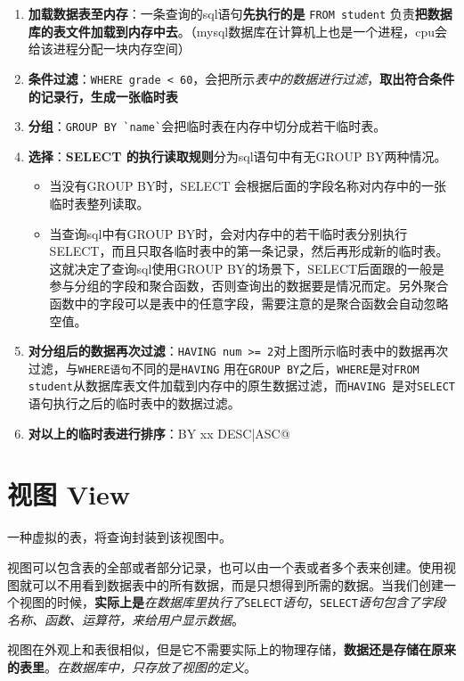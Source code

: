 \documentclass[UTF8,a4paper,12pt]{ctexbook}
\begin{document}
		\begin{enumerate}
			\item \textbf{加载数据表至内存}：一条查询的sql语句\textbf{先执行的是} \verb|FROM student| 负责\textbf{把数据库的表文件加载到内存中去}。（mysql数据库在计算机上也是一个进程，cpu会给该进程分配一块内存空间）
			\item \textbf{条件过滤}：\verb|WHERE grade < 60|，会把所示\textit{表中的数据进行过滤}，\textbf{取出符合条件的记录行，生成一张临时表}
			\item \textbf{分组}：\verb|GROUP BY `name`|会把临时表在内存中切分成若干临时表。
			\item \textbf{选择}：\textbf{SELECT 的执行读取规则}分为sql语句中有无GROUP BY两种情况。
				\begin{itemize}
					\item 当没有GROUP BY时，SELECT 会根据后面的字段名称对内存中的一张临时表整列读取。
					\item 当查询sql中有GROUP BY时，会对内存中的若干临时表分别执行SELECT，而且只取各临时表中的第一条记录，然后再形成新的临时表。这就决定了查询sql使用GROUP BY的场景下，SELECT后面跟的一般是参与分组的字段和聚合函数，否则查询出的数据要是情况而定。另外聚合函数中的字段可以是表中的任意字段，需要注意的是聚合函数会自动忽略空值。
				\end{itemize}
			\item \textbf{对分组后的数据再次过滤}：\verb|HAVING num >= 2|对上图所示临时表中的数据再次过滤，与\verb|WHERE语句|不同的是\verb|HAVING| 用在\verb|GROUP BY|之后，\verb|WHERE|是对\verb|FROM student|从数据库表文件加载到内存中的原生数据过滤，而\verb|HAVING |是对\verb|SELECT |语句执行之后的临时表中的数据过滤。
			\item \textbf{对以上的临时表进行排序}：\verb@ORDER BY xx DESC|ASC@
		\end{enumerate}
		
	
	
	\section{视图 View}
		一种虚拟的表，将查询封装到该视图中。
		
		视图可以包含表的全部或者部分记录，也可以由一个表或者多个表来创建。使用视图就可以不用看到数据表中的所有数据，而是只想得到所需的数据。当我们创建一个视图的时候，\textbf{实际上是}\textit{在数据库里执行了}\verb|SELECT|\textit{语句}，\verb|SELECT|\textit{语句包含了字段名称、函数、运算符，来给用户显示数据}。
		
		视图在外观上和表很相似，但是它不需要实际上的物理存储，\textbf{数据还是存储在原来的表里}。\textit{在数据库中，只存放了视图的定义}。
		
\end{document}
